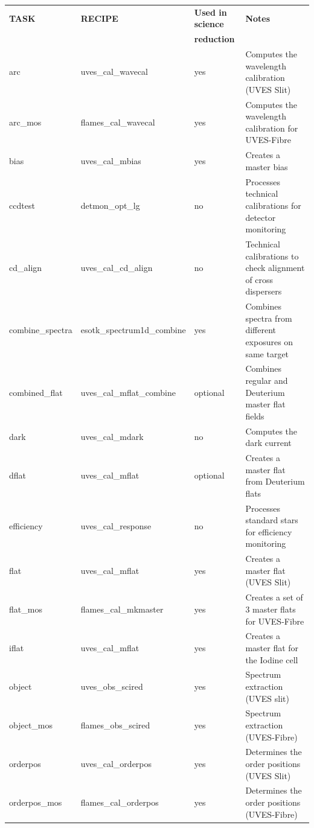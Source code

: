 \begin{table}[htbp]
\centering
\scriptsize
\begin{tabular}{|l|l|l|p{7cm}|}
\hline
\textbf{TASK} & \textbf{RECIPE} & \textbf{Used in science} & \textbf{Notes} \\
 & &\textbf{reduction} & \\
\hline 
arc              &uves\_cal\_wavecal &yes      &Computes the wavelength calibration (UVES Slit) \\
arc\_mos         &flames\_cal\_wavecal &yes      &Computes the wavelength calibration for UVES-Fibre \\
bias             &uves\_cal\_mbias     &yes      &Creates a master bias \\
ccdtest          &detmon\_opt\_lg      &no       &Processes technical calibrations for detector monitoring\\
cd\_align        &uves\_cal\_cd\_align &no       &Technical calibrations to check alignment of cross dispersers\\
combine\_spectra &esotk\_spectrum1d\_combine &yes      &Combines spectra from different exposures on same target\\
combined\_flat   &uves\_cal\_mflat\_combine  &optional &Combines regular and Deuterium master flat fields\\
dark             &uves\_cal\_mdark           &no       &Computes the dark current\\
dflat            &uves\_cal\_mflat           &optional &Creates a master flat from Deuterium flats\\
efficiency       &uves\_cal\_response        &no       &Processes standard stars for efficiency monitoring\\
flat             &uves\_cal\_mflat           &yes      &Creates a master flat (UVES Slit)\\
flat\_mos        &flames\_cal\_mkmaster      &yes      &Creates a set of 3 master flats for UVES-Fibre\\
iflat            &uves\_cal\_mflat           &yes      &Creates a master flat for the Iodine cell\\
object           &uves\_obs\_scired          &yes      &Spectrum extraction (UVES slit)\\
object\_mos      &flames\_obs\_scired        &yes      &Spectrum extraction (UVES-Fibre)\\
orderpos         &uves\_cal\_orderpos        &yes      &Determines the order positions (UVES Slit)\\
orderpos\_mos    &flames\_cal\_orderpos      &yes      &Determines the order positions (UVES-Fibre)\\

\end{tabular}
\end{table}
